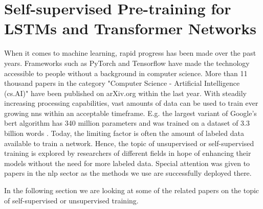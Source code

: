 \section{Self-supervised Pre-training for LSTMs and Transformer Networks}

When it comes to machine learning, rapid progress has been made over the past years. Frameworks such as PyTorch \cite{pytorch} and Tensorflow \cite{tensorflow} have made the technology accessible to people without a background in computer science. More than 11 thousand papers in the category "Computer Science - Artificial Intelligence (cs.AI)" have been published on arXiv.org \cite{arxiv} within the last year. With steadily increasing processing capabilities, vast amounts of data can be used to train ever growing \glspl{nn} within an acceptable timeframe.  E.g. the largest variant of Google's \gls{bert} algorithm has 340 million parameters and was trained on a dataset of 3.3 billion words \cite{bert}. Today, the limiting factor is often the amount of labeled data available to train a network. Hence, the topic of unsupervised or self-supervised training is explored by researchers of different fields in hope of enhancing their models without the need for more labeled data. Special attention was given to papers in the \gls{nlp} sector as the methods we use are successfully deployed there. 

In the following section we are looking at some of the related papers on the topic of self-supervised  or unsupervised training. \par



